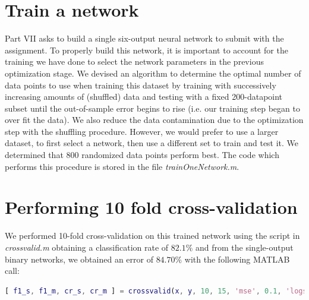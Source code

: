 \documentclass[a4paper,12pt,oneside,final]{report}
\newenvironment{changemargin}[2]{\begin{list}{}{%
\setlength{\topsep}{0pt}%
\setlength{\leftmargin}{0pt}%
\setlength{\rightmargin}{0pt}%
\setlength{\listparindent}{\parindent}%
\setlength{\itemindent}{\parindent}%
\setlength{\parsep}{0pt plus 1pt}%
\addtolength{\leftmargin}{#1}%
\addtolength{\rightmargin}{#2}%
}\item }{\end{list}}
\begin{document}
\section{Train a network}
Part VII asks to build a single six-output neural network to submit with the assignment.  To properly build this network, it is important to account for the training we have done to select the network parameters in the previous optimization stage.  We devised an algorithm to determine the optimal number of data points to use when training this dataset by training with successively increasing amounts of (shuffled) data and testing with a fixed 200-datapoint subset until the out-of-sample error begins to rise (i.e. our training step began to over fit the data).  We also reduce the data contamination due to the optimization step with the shuffling procedure.  However, we would prefer to use a larger dataset, to first select a network, then use a different set to train and test it.  We determined that 800 randomized data points perform best.  The code which performs this procedure is stored in the file \textit{trainOneNetwork.m}.


\section{Performing 10 fold cross-validation}
We performed 10-fold cross-validation on this trained network using the script in \textit{crossvalid.m} obtaining a classification rate of $82.1\%$ and from the single-output binary networks, we obtained an error of $84.70\%$ with the following MATLAB call:
\begin{changemargin}{-5mm}{-5mm}
\begin{lstlisting}[language=Matlab, frame=single]		
[ f1_s, f1_m, cr_s, cr_m ] = crossvalid(x, y, 10, 15, 'mse', 0.1, 'logsig', 'traincgb', 'tansig', 'trainbr', 6 ,6);
\end{lstlisting}
\end{changemargin}
\end{document}
